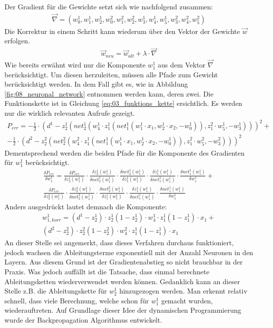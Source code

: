 Der Gradient für die Gewichte setzt sich wie nachfolgend zusammen:
\begin{align}
    \vec{\nabla} = (w_0^1, w_1^1, w_2^1, w_0^2, w_1^2, w_2^2, w_3^1, w_4^1, w_5^1, w_3^2, w_4^2, w_5^2)
\end{align}
Die Korrektur in einem Schritt kann wiederum über den Vektor der Gewichte $\vec{w}$ erfolgen.
\begin{align}
    \vec{w}_{neu} = \vec{w}_{alt} + \lambda \cdot \vec{\nabla}
\end{align}
Wie bereits erwähnt wird nur die Komponente $w_1^1$ aus dem Vektor $\vec{\nabla}$
berücksichtigt. Um diesen herzuleiten, müssen alle Pfade zum Gewicht berücksichtigt werden.
In dem Fall gibt es, wie in Abbildung \ref{fig:08_neuronal_network} entnommen werden kann, deren zwei.
Die Funktionskette ist in Gleichung \ref{eq:03_funktions_kette} ersichtlich. Es werden nur die wirklich relevanten Aufrufe
gezeigt.
\begin{multline}
    P_{err} = - \frac{1}{2} \cdot (d^1 - z_2^1(net_2^1(w_4^1 \cdot z_1^1(net_1^1(w_1^1 \cdot x_1, w_2^1 \cdot x_2, -w_0^1)), z_1^2 \cdot w_5^1, -w_3^1)))^2 +\\\label{eq:03_funktions_kette}
    - \frac{1}{2} \cdot (d^2 - z_2^2(net_2^2(w_4^2 \cdot z_1^1(net_1^1(w_1^1 \cdot x_1, w_2^1 \cdot x_2, -w_0^1)), z_1^2 \cdot w_5^2, -w_3^2)))^2
\end{multline}
Dementsprechend werden die beiden Pfade für die Komponente des Gradienten für $w_1^1$ berücksichtigt.
\begin{multline}
    \frac{\delta P_{err}}{\delta w_1^1} = \frac{\delta P_{err}}{\delta z_2^1(w_1^1)} \cdot \frac{\delta z_2^1(w_1^1)}{\delta net_2^1(w_1^1)} \cdot \frac{\delta net_2^1(w_1^1)}{\delta z_1^1(w_1^1)} \cdot \frac{\delta z_1^1(w_1^1)}{\delta net_1^1(w_1^1)} \cdot \frac{\delta net_1^1(w_1^1)}{\delta w_1^1} +\\
    \frac{\delta P_{err}}{\delta z_2^2(w_1^1)} \cdot \frac{\delta z_2^2(w_1^1)}{\delta net_2^2(w_1^1)} \cdot \frac{\delta net_2^2(w_1^1)}{\delta z_1^1(w_1^1)} \cdot \frac{\delta z_1^1(w_1^1)}{\delta net_1^1(w_1^1)} \cdot \frac{\delta net_1^1(w_1^1)}{\delta w_1^1}
\end{multline}
Anders ausgedrückt lautet demnach die Komponente:
\begin{multline}
    w_{1,korr}^1 = (d^1 - z_2^1) \cdot z_2^1(1 - z_2^1) \cdot w_4^1 \cdot z_1^1(1 - z_1^1) \cdot x_1 +\\
    (d^2 - z_2^2) \cdot z_2^2(1 - z_2^2) \cdot w_4^2 \cdot z_1^1(1 - z_1^1) \cdot x_1
\end{multline}
An dieser Stelle sei angemerkt, dass dieses Verfahren durchaus funktioniert, jedoch wachsen die Ableitungsterme
exponentiell mit der Anzahl Neuronen in den Layern. Aus diesem Grund ist der Gradientenabstieg so nicht brauchbar in
der Praxis. Was jedoch auffällt ist die Tatsache, dass einmal berechnete Ableitungsketten wiederverwendet werden können.
Gedanklich kann an dieser Stelle z.B. die Ableitungskette für $w_2^1$ hinzugezogen werden. Man erkennt relativ schnell,
dass viele Berechnung, welche schon für $w_1^1$ gemacht wurden, wiederauftreten. Auf Grundlage dieser Idee der
dynamischen Programmierung wurde der Backpropagation Algorithmus entwickelt.

